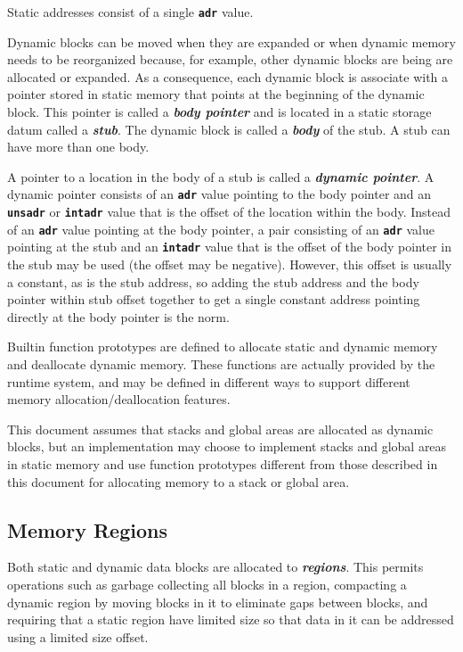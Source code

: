 \documentclass[12pt]{article}
\newcommand{\TT}[1]{{\tt \bfseries #1}}
\newcommand{\key}[1]{{\bf \em #1}\index{#1}}
\newcommand{\skey}[2]{{\bf \em #1#2}\index{#1}}
\begin{document}
Static addresses consist of a single \TT{adr} value.

Dynamic blocks can be moved when they are expanded or when dynamic
memory needs to be reorganized because, for example, other dynamic
blocks are being are allocated or expanded.  As a consequence,
each dynamic block is associate with a pointer stored in static
memory that points at the beginning of the dynamic block.  This
pointer is called a \key{body pointer} and is located
in a static storage datum called a \key{stub}.
The dynamic block is called
a \key{body} of the stub.  A stub can have more than one body.

A pointer to a location in the body of a stub is called
a \key{dynamic pointer}\label{DYNAMIC-POINTER}.  A dynamic pointer
consists of an \TT{adr} value
pointing to the body pointer and an \TT{unsadr} or \TT{intadr}
value that is the offset of the location within the body.
Instead of an \TT{adr} value pointing at the body pointer, a pair consisting
of an \TT{adr} value pointing at the stub and an \TT{intadr} value
that is the offset of the body pointer in the stub may be used (the
offset may be negative).  However,
this offset is usually a constant, as is the stub address,
so adding the stub address and the
body pointer within stub offset together to get a single constant
address pointing directly at the body pointer is the norm.

Builtin function prototypes are defined to allocate static and dynamic memory
and deallocate dynamic memory.  These functions are actually provided
by the runtime system, and may be defined in different ways to support
different memory allocation/deallocation features.

This document assumes\label{DYNAMIC-STACKS-AND-GLOBAL-AREAS}
that stacks and global areas are allocated as dynamic blocks,
but an implementation
may choose to implement stacks and global areas in static memory and use
function prototypes different from those described in this document
for allocating memory to a stack or global area.

\subsection{Memory Regions}
\label{MEMORY-REGIONS}

Both static and dynamic data blocks are allocated to \skey{region}s.
This permits operations such as garbage collecting all blocks in a
region, compacting a dynamic region by moving blocks in it to eliminate
gaps between blocks, and requiring that a static region have limited size
so that data in it can be addressed using a limited size offset.
\end{document}
